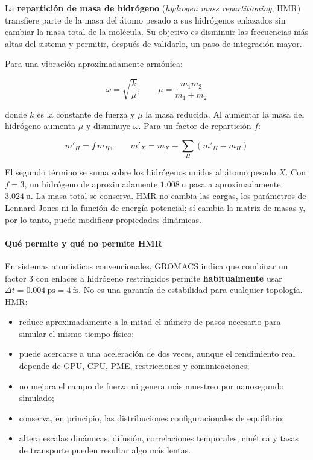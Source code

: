 \documentclass[
  spanish,
  11pt,
  a4paper]{article}
\providecommand{\tightlist}{%
  \setlength{\itemsep}{0pt}\setlength{\parskip}{0pt}}
\begin{document}
La \textbf{repartición de masa de hidrógeno} (\emph{hydrogen mass
repartitioning}, HMR) transfiere parte de la masa del átomo pesado a sus
hidrógenos enlazados sin cambiar la masa total de la molécula. Su
objetivo es disminuir las frecuencias más altas del sistema y permitir,
después de validarlo, un paso de integración mayor.

Para una vibración aproximadamente armónica:

\[
\omega=\sqrt{\frac{k}{\mu}},
\qquad
\mu=\frac{m_1m_2}{m_1+m_2}
\]

donde \(k\) es la constante de fuerza y \(\mu\) la masa reducida. Al
aumentar la masa del hidrógeno aumenta \(\mu\) y disminuye \(\omega\).
Para un factor de repartición \(f\):

\[
m'_{H}=f\,m_H,
\qquad
m'_X=m_X-\sum_H\left(m'_H-m_H\right)
\]

El segundo término se suma sobre los hidrógenos unidos al átomo pesado
\(X\). Con \(f=3\), un hidrógeno de aproximadamente
\(1.008\ \mathrm{u}\) pasa a aproximadamente \(3.024\ \mathrm{u}\). La
masa total se conserva. HMR no cambia las cargas, los parámetros de
Lennard-Jones ni la función de energía potencial; sí cambia la matriz de
masas y, por lo tanto, puede modificar propiedades dinámicas.

\paragraph{Qué permite y qué no permite
HMR}\label{quuxe9-permite-y-quuxe9-no-permite-hmr}

En sistemas atomísticos convencionales, GROMACS indica que combinar un
factor 3 con enlaces a hidrógeno restringidos permite
\textbf{habitualmente} usar
\(\Delta t=0.004\ \mathrm{ps}=4\ \mathrm{fs}\). No es una garantía de
estabilidad para cualquier topología. HMR:

\begin{itemize}
\tightlist
\item
  reduce aproximadamente a la mitad el número de pasos necesario para
  simular el mismo tiempo físico;
\item
  puede acercarse a una aceleración de dos veces, aunque el rendimiento
  real depende de GPU, CPU, PME, restricciones y comunicaciones;
\item
  no mejora el campo de fuerza ni genera más muestreo por nanosegundo
  simulado;
\item
  conserva, en principio, las distribuciones configuracionales de
  equilibrio;
\item
  altera escalas dinámicas: difusión, correlaciones temporales, cinética
  y tasas de transporte pueden resultar algo más lentas.
\end{itemize}
\end{document}
